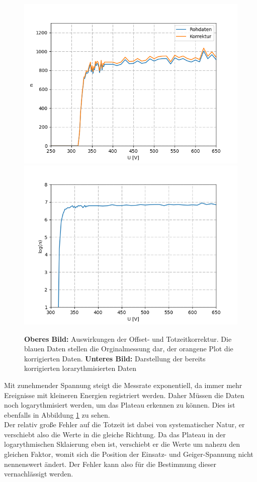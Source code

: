 \documentclass[12pt,a4paper]{article}
\begin{document}
\begin{figure}
\centering
\includegraphics[scale=0.9]{Bilder/GMTotzeit.PNG}
\includegraphics[scale=0.9]{Bilder/GMlogroh.PNG}
\caption{\textbf{Oberes Bild:} Auswirkungen der Offset- und Totzeitkorrektur. Die blauen Daten stellen die Orginalmessung dar, der orangene Plot die korrigierten Daten. \textbf{Unteres Bild:} Darstellung der bereits korrigierten lorarythmisierten Daten}
\label{fig:GMTotzeit}
\end{figure}

Mit zunehmender Spannung steigt die Messrate exponentiell, da immer mehr Ereignisse mit kleineren Energien registriert werden. Daher Müssen die Daten noch logarythmisiert werden, um das Plateau erkennen zu können. Dies ist ebenfalls in Abbildung \ref{fig:GMTotzeit} zu sehen.\\
Der relativ große Fehler auf die Totzeit ist dabei von systematischer Natur, er verschiebt also die Werte in die gleiche Richtung. Da das Plateau in der logarythmischen Sklaierung eben ist, verschiebt er die Werte um nahezu den gleichen Faktor, womit sich die Position der Einsatz- und Geiger-Spannung nicht nennenswert ändert. Der Fehler kann also für die Bestimmung dieser vernachlässigt werden.
\end{document}

